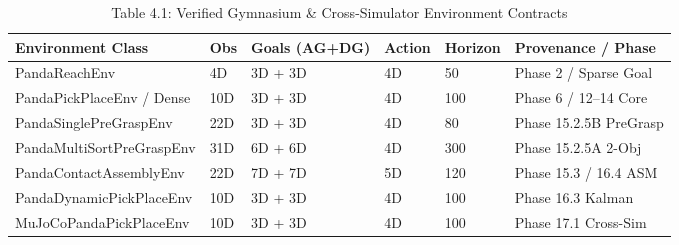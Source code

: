 \begin{longtable}{l l l l l l}\caption{Table 4.1: Verified Gymnasium \& Cross-Simulator Environment Contracts}\\\toprule
Environment Class & Obs & Goals (AG+DG) & Action & Horizon & Provenance / Phase \\ \midrule \endhead
PandaReachEnv & 4D & 3D + 3D & 4D & 50 & Phase 2 / Sparse Goal \\
PandaPickPlaceEnv / Dense & 10D & 3D + 3D & 4D & 100 & Phase 6 / 12–14 Core \\
PandaSinglePreGraspEnv & 22D & 3D + 3D & 4D & 80 & Phase 15.2.5B PreGrasp \\
PandaMultiSortPreGraspEnv & 31D & 6D + 6D & 4D & 300 & Phase 15.2.5A 2-Obj \\
PandaContactAssemblyEnv & 22D & 7D + 7D & 5D & 120 & Phase 15.3 / 16.4 ASM \\
PandaDynamicPickPlaceEnv & 10D & 3D + 3D & 4D & 100 & Phase 16.3 Kalman \\
MuJoCoPandaPickPlaceEnv & 10D & 3D + 3D & 4D & 100 & Phase 17.1 Cross-Sim \\
\bottomrule \end{longtable}